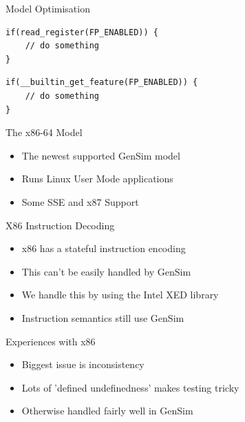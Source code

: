 \begin{frame}[fragile]{Model Optimisation}
\begin{lstlisting}
if(read_register(FP_ENABLED)) {
	// do something
}
\end{lstlisting}

\begin{lstlisting}
if(__builtin_get_feature(FP_ENABLED)) {
	// do something
}
\end{lstlisting}

\end{frame}


\begin{frame}{The x86-64 Model}

\begin{itemize}
\item The newest supported GenSim model
\item Runs Linux User Mode applications
\item Some SSE and x87 Support
\end{itemize}

\end{frame}

\begin{frame}{X86 Instruction Decoding}
\begin{itemize}
\item x86 has a stateful instruction encoding
\item This can't be easily handled by GenSim
\item We handle this by using the Intel XED library
\item Instruction semantics still use GenSim
\end{itemize}
\end{frame}

\begin{frame}{Experiences with x86}

\begin{itemize}
\item Biggest issue is inconsistency
\item Lots of 'defined undefinedness' makes testing tricky
\item Otherwise handled fairly well in GenSim
\end{itemize}

\end{frame}


